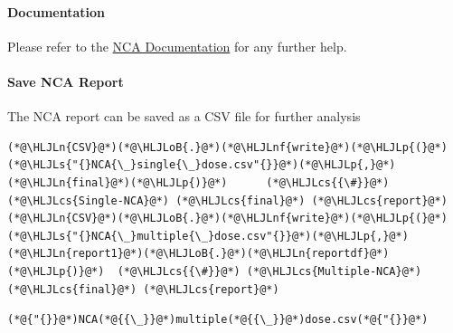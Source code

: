 \documentclass[12pt,a4paper]{article}
\newcommand{\HLJLn}[1]{#1}
\newcommand{\HLJLnf}[1]{\textcolor[RGB]{66,102,213}{#1}}
\newcommand{\HLJLs}[1]{\textcolor[RGB]{201,61,57}{#1}}
\newcommand{\HLJLoB}[1]{\textcolor[RGB]{102,102,102}{\textbf{#1}}}
\newcommand{\HLJLp}[1]{#1}
\newcommand{\HLJLcs}[1]{\textcolor[RGB]{153,153,119}{\textit{#1}}}
\begin{document}
\paragraph{Documentation}
Please refer to the \href{https://docs.pumas.ai/dev/basics/nca/}{NCA Documentation} for any further help.

\paragraph{Save NCA Report}
The NCA report can be saved as a CSV file for further analysis


\begin{lstlisting}
(*@\HLJLn{CSV}@*)(*@\HLJLoB{.}@*)(*@\HLJLnf{write}@*)(*@\HLJLp{(}@*)(*@\HLJLs{"{}NCA{\_}single{\_}dose.csv"{}}@*)(*@\HLJLp{,}@*) (*@\HLJLn{final}@*)(*@\HLJLp{)}@*)      (*@\HLJLcs{{\#}}@*) (*@\HLJLcs{Single-NCA}@*) (*@\HLJLcs{final}@*) (*@\HLJLcs{report}@*)
(*@\HLJLn{CSV}@*)(*@\HLJLoB{.}@*)(*@\HLJLnf{write}@*)(*@\HLJLp{(}@*)(*@\HLJLs{"{}NCA{\_}multiple{\_}dose.csv"{}}@*)(*@\HLJLp{,}@*) (*@\HLJLn{report1}@*)(*@\HLJLoB{.}@*)(*@\HLJLn{reportdf}@*)(*@\HLJLp{)}@*)  (*@\HLJLcs{{\#}}@*) (*@\HLJLcs{Multiple-NCA}@*) (*@\HLJLcs{final}@*) (*@\HLJLcs{report}@*)
\end{lstlisting}

\begin{lstlisting}
(*@{"{}}@*)NCA(*@{{\_}}@*)multiple(*@{{\_}}@*)dose.csv(*@{"{}}@*)
\end{lstlisting}
\end{document}
